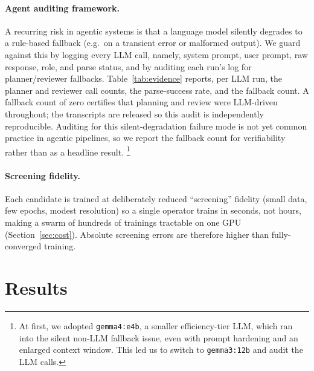 \documentclass{article}
\begin{document}
\paragraph{Agent auditing framework.}\label{sec:evidence}
A recurring risk in agentic systems is that a language model silently degrades to a rule-based fallback (e.g.\ on a transient error or malformed output). We guard against this by logging every LLM call, namely, system prompt, user prompt, raw response, role, and parse status, and by auditing each run's log for planner/reviewer fallbacks. Table~\ref{tab:evidence} reports, per LLM run, the planner and reviewer call counts, the parse-success rate, and the fallback count. A fallback count of zero certifies that planning and review were LLM-driven throughout; the transcripts are released so this audit is independently reproducible. Auditing for this silent-degradation failure mode is not yet common practice in agentic pipelines, so we report the fallback count for verifiability rather than as a headline result. \footnote{At first, we adopted \texttt{gemma4:e4b}, a smaller efficiency-tier LLM, which ran into the silent non-LLM fallback issue, even with prompt hardening and an enlarged context window. This led us to switch to \texttt{gemma3:12b} and audit the LLM calls.}

\paragraph{Screening fidelity.}
Each candidate is trained at deliberately reduced ``screening'' fidelity (small data, few epochs, modest resolution) so a single operator trains in seconds, not hours, making a swarm of hundreds of trainings tractable on one GPU (Section~\ref{sec:cost}). Absolute screening errors are therefore higher than fully-converged training.

\section{Results}\label{sec:results}
\end{document}
